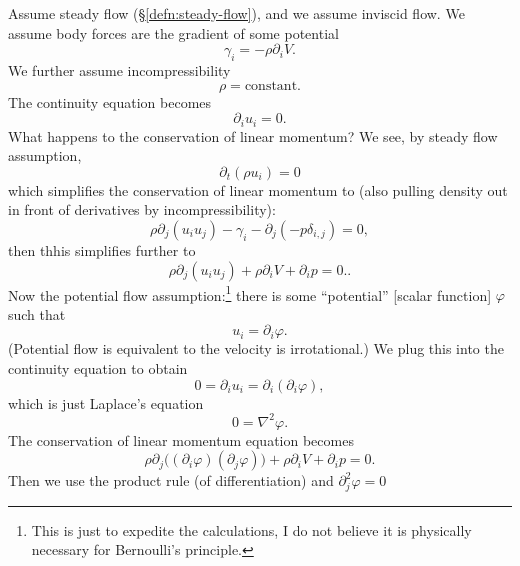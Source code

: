 \begin{example}
Assume steady flow (\S\ref{defn:steady-flow}), and we assume inviscid
flow. We assume body forces are the gradient of some potential
\begin{equation}
\gamma_{i}=-\rho\partial_{i}V.
\end{equation}
We further assume incompressibility
\begin{equation}
\rho=\mbox{constant}.
\end{equation}
The continuity equation becomes
\begin{equation}
\partial_{i}u_{i}=0.
\end{equation}
What happens to the conservation of linear momentum? We see, by steady flow
assumption,
\begin{equation}
\partial_{t}(\rho u_{i})=0
\end{equation}
which simplifies the conservation of linear momentum to (also pulling
density out in front of derivatives by incompressibility):
\begin{equation}
\rho\partial_{j}(u_{i}u_{j})-\gamma_{i}-\partial_{j}(-p\delta_{i,j})=0,
\end{equation}
then thhis simplifies further to
\begin{equation}
\rho\partial_{j}(u_{i}u_{j})+\rho\partial_{i}V+\partial_{i}p=0..
\end{equation}
Now the potential flow assumption:\footnote{This is just to expedite
the calculations, I do not believe it is physically necessary for
Bernoulli's principle.} there is some ``potential''
[scalar function] $\varphi$ such that
\begin{equation}
u_{i}=\partial_{i}\varphi.
\end{equation}
(Potential flow is equivalent to the velocity is irrotational.) We
plug this into the continuity equation to obtain
\begin{equation}
0=\partial_{i}u_{i}=\partial_{i}(\partial_{i}\varphi),
\end{equation}
which is just Laplace's equation
\begin{equation}
0=\nabla^{2}\varphi.
\end{equation}
The conservation of linear momentum equation becomes
\begin{equation}
\rho\partial_{j}\bigl((\partial_{i}\varphi)(\partial_{j}\varphi)\bigr)+\rho\partial_{i}V+\partial_{i}p=0.
\end{equation}
Then we use the product rule (of differentiation) and $\partial_{j}^{2}\varphi=0$

\end{example}
